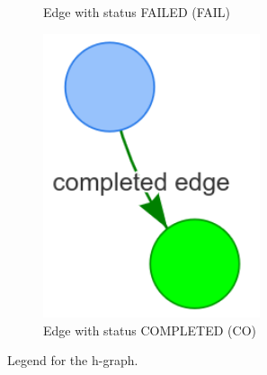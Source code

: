 \begin{figure}[H]
\begin{subfigure}{0.33\textwidth}
    \caption{Edge with status FAILED (FAIL)}%
    \end{subfigure}
    \begin{subfigure}{0.33\textwidth}
    \centering
    \includegraphics[width=0.7\textwidth]{figures/proposed_method/connecting_nodes/legend/completed_edge}
    \caption{Edge with status COMPLETED (CO)}%
    \end{subfigure}
    \caption{Legend for the \acl{h-graph}. }%
    \label{fig:h-graph_legend}
\end{figure}
